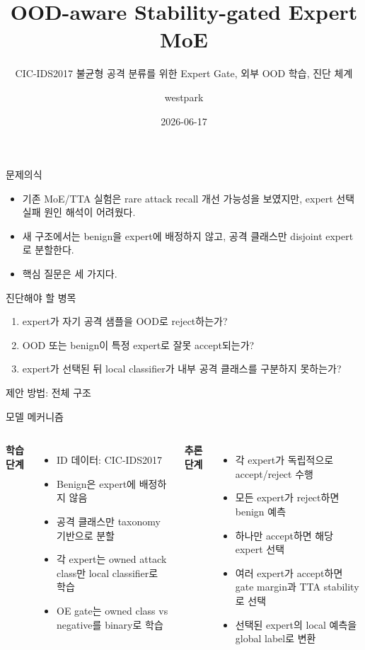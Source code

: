 \documentclass[aspectratio=169]{beamer}
\title{OOD-aware Stability-gated Expert MoE}
\subtitle{CIC-IDS2017 불균형 공격 분류를 위한 Expert Gate, 외부 OOD 학습, 진단 체계}
\author{westpark}
\date{2026-06-17}
\institute{CIC-IDS2017 \quad / \quad Auxiliary OOD: CIC2018 후보}
\begin{document}
\begin{frame}
  \titlepage
\end{frame}

\begin{frame}{문제의식}
\begin{itemize}
  \item 기존 MoE/TTA 실험은 rare attack recall 개선 가능성을 보였지만, expert 선택 실패 원인 해석이 어려웠다.
  \item 새 구조에서는 benign을 expert에 배정하지 않고, 공격 클래스만 disjoint expert로 분할한다.
  \item 핵심 질문은 세 가지다.
\end{itemize}

\vspace{0.4em}
\begin{block}{진단해야 할 병목}
\begin{enumerate}
  \item expert가 자기 공격 샘플을 OOD로 reject하는가?
  \item OOD 또는 benign이 특정 expert로 잘못 accept되는가?
  \item expert가 선택된 뒤 local classifier가 내부 공격 클래스를 구분하지 못하는가?
\end{enumerate}
\end{block}
\end{frame}

\begin{frame}{제안 방법: 전체 구조}
\begin{center}
\resizebox{0.96\textwidth}{!}{}
\end{center}
\end{frame}

\begin{frame}{모델 메커니즘}
\begin{columns}[T]
\textbf{학습 단계}
\begin{itemize}
  \item ID 데이터: CIC-IDS2017
  \item Benign은 expert에 배정하지 않음
  \item 공격 클래스만 taxonomy 기반으로 분할
  \item 각 expert는 owned attack class만 local classifier로 학습
  \item OE gate는 owned class vs negative를 binary로 학습
\end{itemize}

\textbf{추론 단계}
\begin{itemize}
  \item 각 expert가 독립적으로 accept/reject 수행
  \item 모든 expert가 reject하면 benign 예측
  \item 하나만 accept하면 해당 expert 선택
  \item 여러 expert가 accept하면 gate margin과 TTA stability로 선택
  \item 선택된 expert의 local 예측을 global label로 변환
\end{itemize}
\end{columns}
\end{frame}
\end{document}
